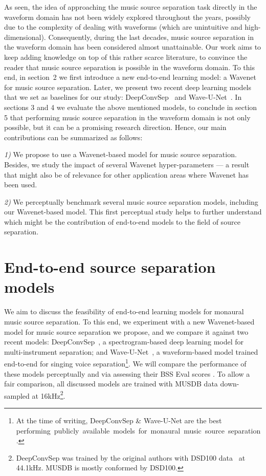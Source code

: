 \documentclass[a4paper]{article}
\begin{document}
As seen, the idea of approaching the music source separation task directly in the waveform domain has not been widely explored throughout the years, possibly due to the complexity of dealing with waveforms (which are unintuitive and high-dimensional). Consequently, during the last decades, music source separation in the waveform domain has been considered almost unattainable.
Our work aims to keep adding knowledge on top of this rather scarce literature, to convince the reader that music source separation is possible in the waveform domain.
To this end, in section~2 we first introduce a new end-to-end learning model: a Wavenet for music source separation. Later, we present two recent deep learning models that we set as baselines for our study: DeepConvSep~\cite{chandna2017monoaural} and Wave-U-Net~\cite{stoller2018wave}. 
In sections 3 and 4 we evaluate the above mentioned models, to conclude in section 5 that performing music source separation in the waveform domain is not only possible, but it can be a promising research direction. 
Hence, our main contributions can be summarized as follows:

\noindent \hspace{1mm} \textit{1)} We propose to use a Wavenet-based model for music source separation. Besides, we study the impact of several Wavenet hyper-parameters --- a result that might also be of relevance for other application areas where Wavenet has been used.

\noindent \hspace{1mm} \textit{2)} We perceptually benchmark several music source separation models, including our Wavenet-based model. This first perceptual study helps to further understand which might be the contribution of end-to-end models to the field of source separation.

\section{End-to-end source separation models}

We aim to discuss the feasibility of end-to-end learning models for monaural music source separation. To this end, we experiment with a new Wavenet-based model for music source separation we propose, and we compare it against two recent models: DeepConvSep~\cite{chandna2017monoaural}, a spectrogram-based deep learning model for multi-instrument separation; and Wave-U-Net~\cite{stoller2018wave}, a waveform-based model trained end-to-end for singing voice separation\footnote{\label{best}At the time of writing, DeepConvSep \& Wave-U-Net are the best \mbox{performing publicly available models for monaural music source separation.}}. We will compare the performance of these models perceptually and via assessing their {BSS Eval} scores \cite{evaltoolbox}. To allow a fair comparison, all discussed models are trained with MUSDB data down-sampled at 16kHz\footnote{DeepConvSep was trained by the original authors with DSD100 data~\cite{SiSEC16} at 44.1kHz. MUSDB is mostly conformed by DSD100.}.
\end{document}
